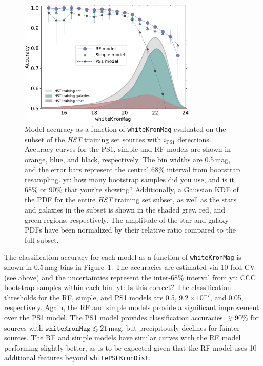 \documentclass[twocolumn, dvipdfmx]{aastex62}
\newcommand{\yutaro}[1]{{\color{red} yt: {#1}}}
\begin{document}
\begin{figure}[t]
 \centering
  \includegraphics[width=3.35in]{./Figures/CV_Accuracy_HST.pdf}
  \caption{Model accuracy as a function of \texttt{whiteKronMag} evaluated
  on the subset of the \textit{HST} training set sources with
  $i_\mathrm{PS1}$ detections. Accuracy curves for the PS1, simple and RF
  models are shown in orange, blue, and black, respectively. The bin widths
  are 0.5\,mag, and the error bars represent the central 68\% interval from
  bootstrap resampling. \yutaro{how many bootstrap samples did you use, and
  is it 68\% or 90\% that your're showing?} Additionally, a Gaussian KDE of
  the PDF for the entire \textit{HST} training set subset, as well as the
  stars and galaxies in the subset is shown in the shaded grey, red, and
  green regions, respectively. The amplitude of the star and galaxy PDFs
  have been normalized by their relative ratio compared to the full subset. }
  \label{fig:cvacc_hst}
\end{figure}

The classification accuracy for each model as a function of
\texttt{whiteKronMag} is shown in 0.5\,mag bins in
Figure~\ref{fig:cvacc_hst}. The accuracies are estimated via 10-fold CV (see
above) and the uncertainties represent the inter-68\% interval from
\yutaro{CCC} bootstrap samples within each bin. \yutaro{Is this correct?}
The classification thresholds for the RF, simple, and PS1 models are 0.5,
$9.2 \times 10^{-7}$, and 0.05, respectively. Again, the RF and simple
models provide a significant improvement over the PS1 model. The PS1 model
provides classification accuracies $\gtrsim$90\% for sources with
$\mathtt{whiteKronMag} \lesssim 21\,\mathrm{mag}$, but precipitously
declines for fainter sources. The RF and simple models have similar curves
with the RF model performing slightly better, as is to be expected given
that the RF model uses 10 additional features beyond
\texttt{whitePSFKronDist}.
\end{document}
